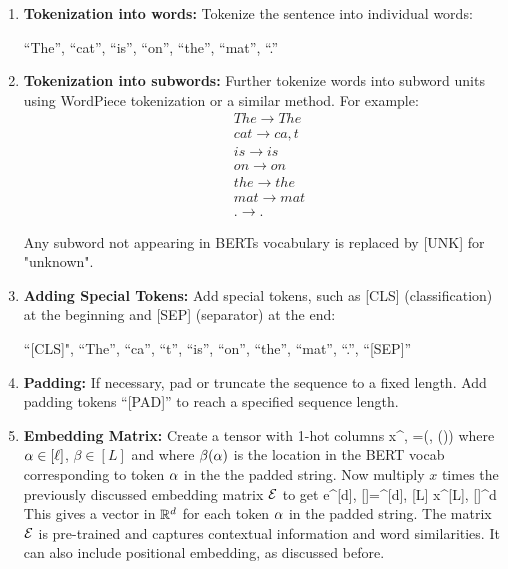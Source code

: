 \begin{enumerate}

  \item \textbf{Tokenization into words:}
       Tokenize the sentence into individual words: 
       
       ``The'', ``cat'', ``is'', ``on'', ``the'', ``mat'', ``.''
  
  \item \textbf{Tokenization into subwords:}
     Further tokenize words into subword units using WordPiece tokenization or a similar method. For example:
         \begin{align*}
           &The \rightarrow The \\
           &cat \rightarrow ca, t \\
           &is \rightarrow is \\
           &on \rightarrow on \\
           &the \rightarrow the \\
           &mat \rightarrow mat \\
           &. \rightarrow .
         \end{align*}
         
         Any subword not appearing in BERTs vocabulary is replaced by [UNK] for "unknown".
  
  \item \textbf{Adding Special Tokens:}
     Add special tokens, such as [CLS] (classification) at the beginning and [SEP] (separator) at the end:
     
      ``[CLS]", ``The'', ``ca'', ``t'', ``is'', ``on'', ``the'', ``mat'', ``.'', ``[SEP]''
  
  \item \textbf{Padding:}
     If necessary, pad or truncate the sequence to a fixed length. Add  padding tokens ``[PAD]'' to reach a specified sequence length.
  
  \item \textbf{Embedding Matrix:}
     Create a
       tensor with 1-hot columns
       \beq x^{\beta, \alp}
       =\delta(\beta, \beta(\alp))
       \eeq
       where $\alpha\in[\ell]$, $\beta\in[L]$ and where $\beta(\alpha)$
       is the location in the
              BERT vocab
       corresponding to token $\alpha$ in the
       the padded string.
       Now multiply $x$ times the previously discussed embedding matrix ${\cal E}$ to get \beq
       e^{[d], [\ell]}=\cale^{[d], [L]}
       x^{[L], [\ell]}\in\RR^{d\times \ell}\eeq
       This gives a vector in ${ \mathbb{R}}^d$
       for each token $\alpha$ in the 
       padded string.
        The matrix ${\cal E}$
        is pre-trained and captures contextual information
        and word similarities. It can also
        include positional embedding, as discussed before. 
\end{enumerate}

